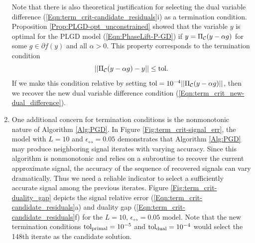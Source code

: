 \begin{enumerate}
Note that there is also theoretical justification for selecting the dual variable difference (\ref{Eqn:term_crit-candidate_residuals}i) as a termination condition.  Proposition \ref{Prop:PLGD-opt_unconstrained} showed that the variable $y$ is optimal for the PLGD model (\ref{Eqn:PhaseLift-P-GD}) if $y = \Pi_{\mathcal C}(y - \alpha g)$ for some $g \in \partial f(y)$ and all $\alpha > 0$.  This property corresponds to the termination condition 
\begin{equation*}
|| \Pi_{\mathcal C}(y - \alpha g) - y || \leq \text{tol}.
\end{equation*}
If we make this condition relative by setting $\text{tol} = 10^{-4}||\Pi_{\mathcal C}(y - \alpha g)||$, then we recover the new dual variable difference condition (\ref{Eqn:term_crit_new-dual_difference}).




\item

One additional concern for termination conditions is the nonmonotonic nature of Algorithm \ref{Alg:PGD}.  In Figure \ref{Fig:term_crit-signal_err}, the model with $L = 10$ and $\epsilon_\rel = 0.05$ demonstrates that Algorithm \ref{Alg:PGD} may produce neighboring signal iterates with varying accuracy.  Since this algorithm is nonmonotonic and relies on a subroutine to recover the current approximate signal, the accuracy of the sequence of recovered signals can vary dramatically.  Thus we need a reliable indicator to select a sufficiently accurate signal among the previous iterates.  Figure \ref{Fig:term_crit-duality_gap} depicts the signal relative error (\ref{Eqn:term_crit-candidate_residuals}a) and duality gap (\ref{Eqn:term_crit-candidate_residuals}f) for the $L = 10$, $\epsilon_\rel = 0.05$ model.  Note that the new termination conditions $\textnormal{tol}_\text{primal} = 10^{-5}$ and $\textnormal{tol}_\text{dual} = 10^{-4}$ would select the 148th iterate as the candidate solution.  




\end{enumerate}
